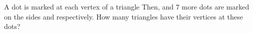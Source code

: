 A dot is marked at each vertex of a triangle  Then,   and $7$ more dots are marked on the sides   and  respectively. How many triangles have their vertices at these dots?